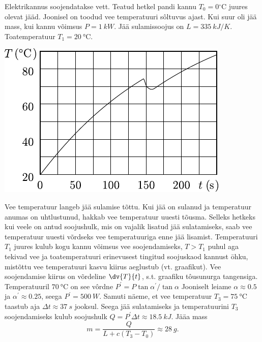 
Elektrikannus soojendatakse vett. Teatud hetkel pandi kannu $T_{0}=0{ }^{\circ} \mathrm{C}$ juures olevat jääd. Joonisel on toodud vee temperatuuri sôltuvus ajast. Kui suur oli jää mass, kui kannu võimsus $P = \SI{1}{kW}$. Jää sulamissoojus on $L = \SI{335}{kJ/K}$.
Toatemperatuur $T_1 = \SI{20}{\degreeCelsius}$.
\begin{center}
	\includegraphics[width=0.7\linewidth]{2004-v3g-06-yl.pdf}
\end{center}

\hint

\solu
Vee temperatuur langeb jää sulamise tõttu. Kui jää on sulanud ja temperatuur anumas on uhtlustunud, hakkab vee temperatuur uuesti tõusma. Selleks hetkeks kui veele on antud soojushulk, mis on vajalik lisatud jää sulatamiseks, saab vee temperatuur uuesti võrdseks vee temperatuuriga enne jää lisamist. Temperatuuri $T_{1}$ juures kulub kogu kannu võimsus vee soojendamiseks, $T>T_{1}$ puhul aga tekivad vee ja toatemperatuuri erinevusest tingitud soojuskaod kannust ōhku, mistõttu vee temperatuuri kasvu kiirus aeglustub (vt. graafikut). Vee soojendamise kiirus on võrdeline $\dv{T}{t}$, s.t. graafiku tôusunurga tangensiga. Temperatuuril $\SI{70}{\degreeCelsius}$ on see vôrdne $P^{\prime}=P \tan \alpha^{\prime} / \tan \alpha$ Jooniselt leiame $\alpha \approx \num{0,5}$ ja $\alpha^{\prime} \approx \num{0,25}$, seega $P^{\prime}=\SI{500}{W}$. Samuti näeme, et vee temperatuur $T_{3}=\SI{75}{\degreeCelsius}$ taastub aja $\Delta t \approx \SI{37}{s}$ jooksul. Seega jää sulatamiseks ja temperatuurini $T_{3}$ soojendamiseks kulub soojushulk $Q=P^{\prime} \Delta t \approx \SI{18,5}{kJ}$. Jääa mass
$$
m=\frac{Q}{L+c\left(T_{3}-T_{0}\right)} \approx \SI{28}{g}.
$$
\probend
